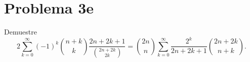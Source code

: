 \section*{Problema 3e}
Demuestre
\[2\sum_{k=0}^\infty (-1)^k \binom{n+k}{k} \frac{2n+2k+1}{\binom{2n+2k}{2k}}
  = \binom{2n}{n}\sum_{k=0}^\infty \frac{2^k}{2n+2k+1}\binom{2n+2k}{n+k}.\]
